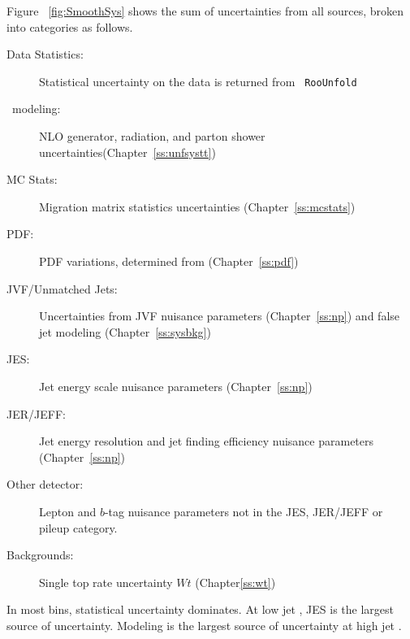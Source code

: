 Figure ~\ref{fig:SmoothSys} shows the sum of uncertainties from all sources, broken into categories as follows.
\begin{description}
\item[Data Statistics:] Statistical uncertainty on the data is returned from \texttt{ RooUnfold}
\item[\ttbar\ modeling:] NLO generator, radiation, and parton shower uncertainties(Chapter~\ref{ss:unfsystt})
\item[MC Stats:] Migration matrix statistics uncertainties (Chapter~\ref{ss:mcstats})
\item[PDF:] PDF variations, determined from \mcnlohw (Chapter~\ref{ss:pdf})
\item[JVF/Unmatched Jets:] Uncertainties from JVF nuisance parameters (Chapter~\ref{ss:np}) and false jet modeling (Chapter~\ref{ss:sysbkg})
\item[JES:] Jet energy scale nuisance parameters (Chapter~\ref{ss:np})
\item[JER/JEFF:] Jet energy resolution and jet finding efficiency nuisance parameters (Chapter~\ref{ss:np})
\item[Other detector:] Lepton and $b$-tag nuisance parameters not in the JES, JER/JEFF or pileup category.
\item[Backgrounds:] Single top rate uncertainty $Wt$ (Chapter\ref{ss:wt}) 
\end{description}

In most bins, statistical uncertainty dominates. At low jet \pt, JES is the largest source of uncertainty. Modeling is the largest source of uncertainty at high jet \pt.




